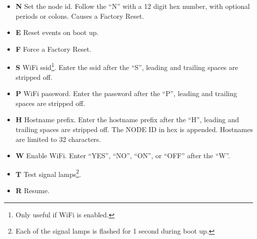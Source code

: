 \begin{itemize}
\item \textbf{N} Set the node id.  Follow the ``N'' with a 12 digit hex 
number, with optional periods or colons.  Causes a Factory Reset.
\item \textbf{E} Reset events on boot up.
\item \textbf{F} Force a Factory Reset.
\item \textbf{S} WiFi ssid\footnote{Only useful if WiFi is 
enabled.\label{fn:wifi}}. Enter the ssid after the ``S'', leading and trailing 
spaces are stripped off.
\item \textbf{P} WiFi password. Enter the password after the 
``P'', leading and trailing spaces are stripped off.
\item \textbf{H} Hostname prefix. Enter the hostname prefix 
after the ``H'', leading and trailing spaces are stripped off. The NODE ID in 
hex is appended.  Hostnames are limited to 32 characters.
\item \textbf{W} Enable WiFi. Enter ``YES'', ``NO'', 
``ON'', or ``OFF'' after the ``W''.
\item \textbf{T} Test signal lamps\footnote{Each of the signal lamps is 
flashed for 1 second during boot up.}.
\item \textbf{R} Resume.
\end{itemize}

